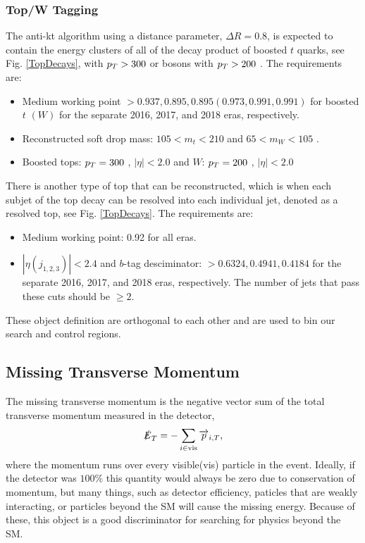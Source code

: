 \subsubsection{Top/W Tagging}\label{TopTagging}
The anti-kt algorithm using a distance parameter, $\Delta R=0.8$, is expected to contain the energy clusters of all of the decay product of boosted $t$ quarks, see Fig. \ref{TopDecays}, with $p_{T}>300$ \GeV or \W bosons with $p_{T}>200$ \GeV. The requirements are:
\begin{itemize}
	\item Medium working point $>0.937, 0.895, 0.895 (0.973, 0.991, 0.991)$ for boosted $t$ $(W)$ for the separate 2016, 2017, and 2018 eras, respectively.
	\item Reconstructed soft drop mass: $105<m_t<210$ \GeV{} and $65<m_W<105$ \GeV.
	\item Boosted tops: $p_{T}=300$ \GeV, $|\eta|<2.0$ and $W$: $p_{T}=200$ \GeV, $|\eta|<2.0$
\end{itemize}

There is another type of top that can be reconstructed, which is when each subjet of the top decay can be resolved into each individual jet, denoted as a resolved top, see Fig. \ref{TopDecays}. The requirements are:
\begin{itemize}
	\item Medium working point: 0.92 for all eras.
	\item $|\eta(j_{1,2,3})|<2.4$ and $b$-tag desciminator: $>0.6324, 0.4941, 0.4184$ for the separate 2016, 2017, and 2018 eras, respectively. The number of jets that pass these cuts should be $\geq2$.
\end{itemize}
These object definition are orthogonal to each other and are used to bin our search and control regions. 

\subsection{Missing Transverse Momentum}\label{MET}
The missing transverse momentum is the negative vector sum of the total transverse momentum measured in the detector,
\begin{equation}
\slashed{E}_{T}=-\sum_{i\in\text{vis}}\overrightarrow{p}_{i, T},
\end{equation}
where the momentum runs over every visible(vis) particle in the event. Ideally, if the detector was $100\%$ this quantity would always be zero due to conservation of momentum, but many things, such as detector efficiency, paticles that are weakly interacting, or particles beyond the SM will cause the missing energy. Because of these, this object is a good discriminator for searching for physics beyond the SM. 

